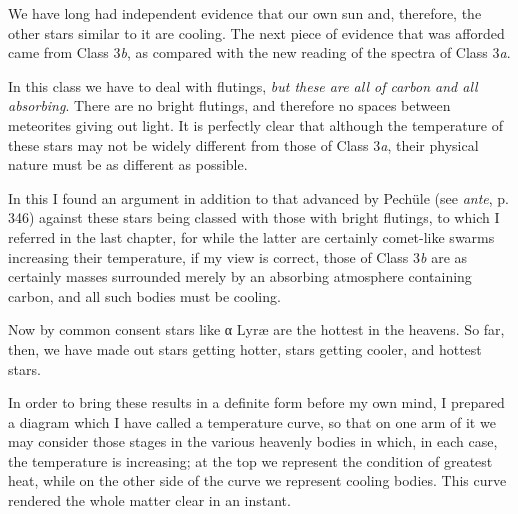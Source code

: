 \documentclass[a4paper, 12pt, oneside, polutonikogreek, english]{article}
\begin{document}
We have long had independent evidence that our own sun and, therefore, the other stars similar to it are cooling. The next piece of evidence that was afforded came from Class 3\emph{b}, as compared with the new reading of the spectra of Class 3\emph{a}.

In this class we have to deal with flutings, \emph{but these are all of carbon and all absorbing}. There are no bright flutings, and therefore no spaces between meteorites giving out light. It is perfectly clear that although the temperature of these stars may not be widely different from those of Class 3\emph{a}, their physical nature must be as different as possible.

In this I found an argument in addition to that advanced by Pechüle (see \emph{ante}, p. 346) against these stars being classed with those with bright flutings, to which I referred in the last chapter, for while the latter are certainly comet-like swarms increasing their temperature, if my view is correct, those of Class 3\emph{b} are as certainly masses surrounded merely by an absorbing atmosphere containing carbon, and all such bodies must be cooling.

Now by common consent stars like α Lyræ are the hottest in the heavens. So far, then, we have made out stars getting hotter, stars getting cooler, and hottest stars.

In order to bring these results in a definite form before my own mind, I prepared a diagram which I have called a temperature curve, so that on one arm of it we may consider those stages in the various heavenly bodies in which, in each case, the temperature is increasing; at the top we represent the condition of greatest heat, while on the other side of the curve we represent cooling bodies. This curve rendered the whole matter clear in an instant.
\end{document}
